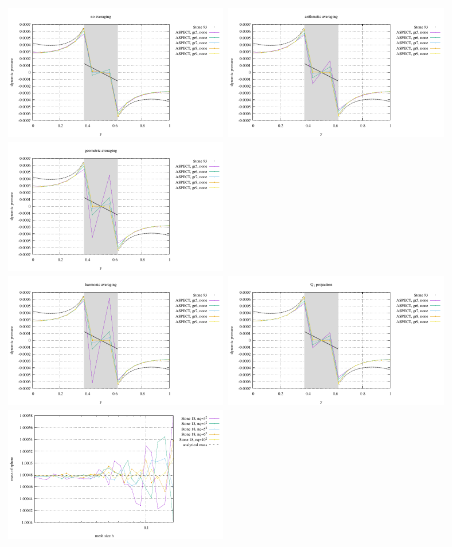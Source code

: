\begin{center}
\includegraphics[width=5.7cm]{images/stokes_sphere2D/pressure_profile_none_NS.pdf}
\includegraphics[width=5.7cm]{images/stokes_sphere2D/pressure_profile_arithmetic_NS.pdf}
\includegraphics[width=5.7cm]{images/stokes_sphere2D/pressure_profile_geometric_NS.pdf}\\
\includegraphics[width=5.7cm]{images/stokes_sphere2D/pressure_profile_harmonic_NS.pdf}
\includegraphics[width=5.7cm]{images/stokes_sphere2D/pressure_profile_q1_NS.pdf}\\
\includegraphics[width=5.7cm]{images/stokes_sphere2D/mass_total}

\end{center}
